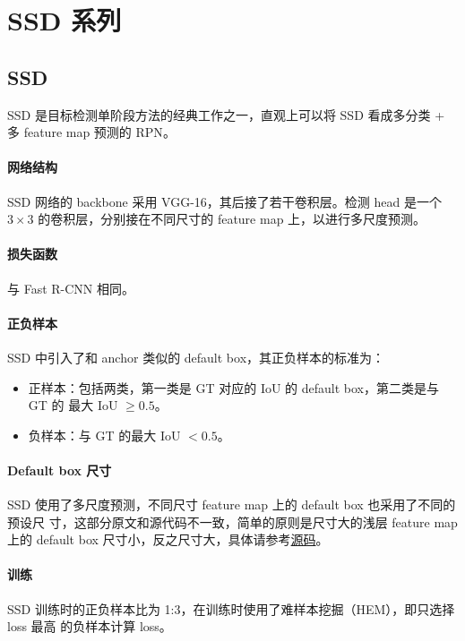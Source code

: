 \section{SSD 系列}
\label{sec:SSD}

\subsection{SSD}
\label{subsec:SSD}

SSD 是目标检测单阶段方法的经典工作之一，直观上可以将 SSD 看成多分类 + 多 feature
map 预测的 RPN\cite{2015-SSD}。

\paragraph{网络结构}
SSD 网络的 backbone 采用 VGG-16，其后接了若干卷积层。检测 head 是一个 $3 \times
3$ 的卷积层，分别接在不同尺寸的 feature map 上，以进行多尺度预测。

\paragraph{损失函数}
与 Fast R-CNN 相同。

\paragraph{正负样本}
SSD 中引入了和 anchor 类似的 default box，其正负样本的标准为：

\begin{itemize}
\item 正样本：包括两类，第一类是 GT 对应的 IoU 的 default box，第二类是与 GT 的
  最大 IoU $ \geq 0.5 $。
\item 负样本：与 GT 的最大 IoU $ < 0.5 $。
\end{itemize}

\paragraph{Default box 尺寸}
SSD 使用了多尺度预测，不同尺寸 feature map 上的 default box 也采用了不同的预设尺
寸，这部分原文和源代码不一致，简单的原则是尺寸大的浅层 feature map 上的 default
box 尺寸小，反之尺寸大，具体请参考\href{https://github.com/weiliu89/caffe/blob/ssd/examples/ssd/ssd_pascal.py}{源码}。

\paragraph{训练}
SSD 训练时的正负样本比为 1:3，在训练时使用了难样本挖掘（HEM），即只选择 loss 最高
的负样本计算 loss。

